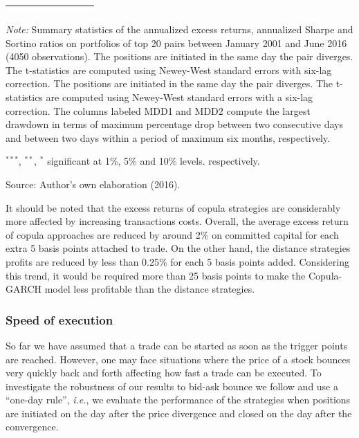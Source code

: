 \documentclass[a4paper,12pt]{report}
\begin{document}
\begin{refsection}
\begin{threeparttable}[H]
\begin{tabularx}{\textwidth}{@{\extracolsep{\fill}}llllllll@{}}
		\multicolumn{1}{r}{} & \multicolumn{1}{r}{} & \multicolumn{1}{r}{} & \multicolumn{1}{r}{} & \multicolumn{1}{r}{} & \multicolumn{1}{r}{} & \multicolumn{1}{r}{} & \multicolumn{1}{r}{} \\
		\bottomrule
	\end{tabularx}%
	\begin{tablenotes}
		\item \textit{Note:} \scriptsize Summary statistics of the annualized excess returns, annualized Sharpe and Sortino ratios on portfolios of top 20 pairs between January 2001 and June 2016 (4050 observations). The positions are initiated in the same day the pair diverges. The t-statistics are computed using Newey-West standard errors with six-lag correction. The positions are initiated in the same day the pair diverges. The t-statistics are computed using Newey-West standard errors with a six-lag correction. The columns labeled MDD1 and MDD2 compute the largest drawdown in terms of maximum percentage drop between two consecutive days and between two days within a period of maximum six months, respectively.
		\item \scriptsize $^{\ast\ast\ast}$, $^{\ast\ast}$, $^{\ast}$ significant at 1\%, 5\% and 10\% levels. respectively.
		\item Source: Author's own elaboration (2016).
	\end{tablenotes}
	\label{tab:table201}%
\end{threeparttable}%

\vspace{0.6cm}

It should be noted that the excess returns of copula strategies are considerably more affected by increasing transactions costs. Overall, the average excess return of copula approaches are reduced by around 2\% on committed capital for each extra 5 basis points attached to trade. On the other hand, the distance strategies profits are reduced by less than 0.25\% for each 5 basis points added. Considering this trend, it would be required more than 25 basis points to make the Copula-GARCH model less profitable than the distance strategies.

\vspace{0.6cm}

\subsubsection{Speed of execution}

So far we have assumed that a trade can be started as soon as the trigger points are reached. However, one may face situations where the price of a stock bounces very quickly back and forth affecting how fast a trade can be executed. To investigate the robustness of our results to bid-ask bounce \citep{j90,jt95,conrad89} we follow \citet*{ggr06} and use a ``one-day rule'', \emph{i.e.}, we evaluate the performance of the strategies when positions are initiated on the day after the price divergence and closed on the day after the convergence.


\end{refsection}
\end{document}
